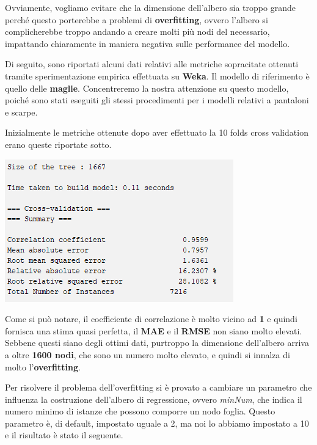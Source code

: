 \documentclass[a4paper, 11pt, oneside]{report}
\begin{document}
                Ovviamente, vogliamo evitare che la dimensione dell'albero sia troppo grande perché questo porterebbe a problemi
                di \textbf{overfitting}, ovvero l'albero si complicherebbe troppo andando a creare molti più nodi
                del necessario, impattando chiaramente in maniera negativa sulle performance del modello.
                \\
                \par \noindent Di seguito, sono riportati alcuni dati relativi alle metriche sopracitate ottenuti tramite
                sperimentazione empirica effettuata su \textbf{Weka}.
                Il modello di riferimento è quello delle \textbf{maglie}. Concentreremo la nostra attenzione su questo
                modello, poiché sono stati eseguiti gli stessi procedimenti per i modelli relativi a pantaloni e scarpe.
                \newpage
                \par \noindent Inizialmente le metriche ottenute dopo aver effettuato la 10 folds cross validation
                erano queste riportate sotto.

                \begin{center}
                    \includegraphics[scale=0.8]{metricheIniziali}
                \end{center}
                \par \noindent Come si può notare, il coefficiente di correlazione è molto vicino ad \textbf{1} e quindi
                fornisca una stima quasi perfetta, il \textbf{MAE} e il \textbf{RMSE} non siano molto elevati.
                Sebbene questi siano degli ottimi dati, purtroppo la dimensione dell'albero arriva a oltre \textbf{1600 nodi}, che
                sono un numero molto elevato, e quindi si innalza di molto l'\textbf{overfitting}.
                \\
                \par \noindent Per risolvere il problema dell'overfitting si è provato a cambiare un parametro che influenza la costruzione dell'albero
                di regressione, ovvero \textit{minNum}, che indica il numero minimo di istanze che possono comporre un nodo
                foglia.
                Questo parametro è, di default, impostato uguale a 2, ma noi lo abbiamo impostato a 10 e il risultato è stato il seguente.
\end{document}
